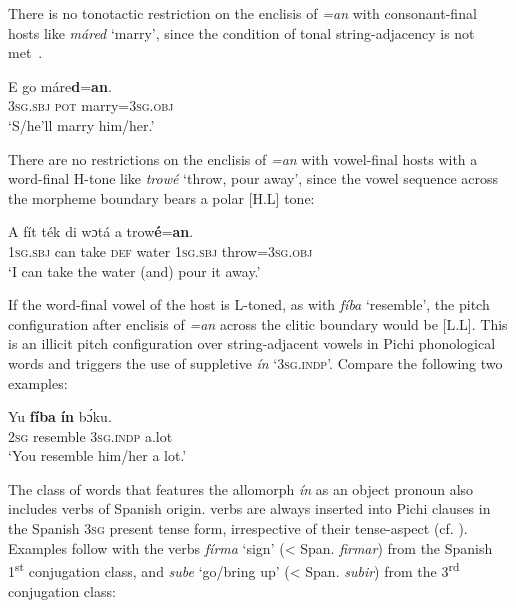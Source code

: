 There is no tonotactic restriction on the enclisis of \textit{=an} with consonant-final hosts like \textit{máred} ‘marry’, since the condition of tonal string-adjacency is not met~.


\ea%
    \label{ex:key:66}
    \gll   E    go  máre\textbf{d}=\textbf{an}.\\
\textsc{3sg.sbj}  \textsc{pot}  marry=\textsc{3sg.obj}\\

\glt ‘S/he’ll marry him/her.’ 
\z

There are no restrictions on the enclisis of \textit{=an} with vowel-final hosts with a word-final H-tone like \textit{trowé} ‘throw, pour away’, since the vowel sequence across the morpheme boundary bears a polar [H.L] tone:


\ea%
    \label{ex:key:67}
    \gll   A    fít  ték    di  wɔtá  a    trow\textbf{é}=\textbf{an}.\\
\textsc{1sg.sbj}  can  take    \textsc{def}  water  \textsc{1sg.sbj}  throw=\textsc{3sg.obj}\\

\glt ‘I can take the water (and) pour it away.’ 
\z

If the word-final vowel of the host is L-toned, as with \textit{fíba} ‘resemble’, the pitch configuration after enclisis of \textit{=an} across the clitic boundary would be [L.L]. This is an illicit pitch configuration over string-adjacent vowels in Pichi phonological words and triggers the use of suppletive \textit{ín} ‘\textsc{3sg.indp’.} Compare the following two examples:


\z


\ea%
    \label{ex:key:69}
    \gll   Yu  \textbf{fíba}      \textbf{ín}    bɔ́ku.\\
\textsc{2sg}  resemble    \textsc{3sg.indp}  a.lot\\

\glt ‘You resemble him/her a lot.’ 
\z

The class of words that features the allomorph \textit{ín} as an object pronoun also includes verbs of Spanish origin.  verbs are always inserted into Pichi clauses in the Spanish \textsc{3sg} present tense form, irrespective of their tense-aspect (cf. ). Examples follow with the verbs \textit{fírma} ‘sign’ (< Span. \textit{firmar}) from the Spanish 1\textsuperscript{st} conjugation class, and \textit{sube} ‘go/bring up’ (< Span. \textit{subir}) from the 3\textsuperscript{rd} conjugation class:


